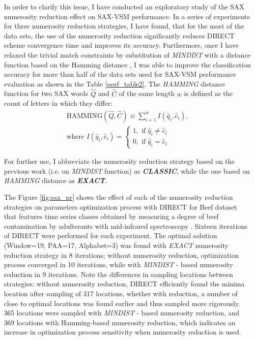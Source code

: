 In order to clarify this issue, I have conducted an exploratory study of the SAX numerosity reduction 
effect on SAX-VSM performance. In a series of experiments for three numerosity reduction strategies, I have found, 
that for the most of the data sets, the use of the numerosity reduction significantly reduces DIRECT scheme convergence 
time and improves its accuracy. 
Furthermore, once I have relaxed the trivial match constraints by substitution of \textit{MINDIST} 
with a distance function based on the Hamming distance \cite{hamming}, 
I was able to improve the classification accuracy for more than half of the data sets used for \mbox{SAX-VSM}
performance evaluation as shown in the Table \ref{perf_table2}. 
The \textit{HAMMING} distance function for two SAX words $\hat{Q}$ and $\hat{C}$ of the same length $w$ 
is defined as the count of letters in which they differ:
\begin{equation}
\label{eq:hamming}
\begin{split}
\text{HAMMING}(\widehat{Q},\widehat{C}) \equiv \sum_{i=1}^{w} I( \widehat{q}_{i}, \widehat{c}_{i} ), \\
\text{where } I( \widehat{q}_{i}, \widehat{c}_{i} ) = 
\begin{cases}
 1,\text{ if } \widehat{q}_{i} \neq \widehat{c}_{i} \\
 0,\text{ if } \widehat{q}_{i} = \widehat{c}_{i}
\end{cases}
\end{split}                                                      
\end{equation}

For further use, I abbreviate the numerosity reduction strategy based on the previous work (i.e. on \textit{MINDIST} 
function) as \textit{\textbf{CLASSIC}}, while the one based on \textit{HAMMING} distance as \textit{\textbf{EXACT}}.

The Figure \ref{fig:sax_nr} shows the effect of each of the numerosity reduction strategies on parameters optimization
process with DIRECT for Beef dataset that features time series classes obtained by measuring a degree of beef contamination 
by adulterants with mid-infrared spectroscopy \cite{citeulike:12859637}. 
Sixteen iterations of DIRECT were performed for each experiment. 
The optimal solution (Window=19, PAA=17, Alphabet=3) was found with \textit{EXACT} numerosity reduction strategy 
in 8 iterations; without numerosity reduction, optimization process converged in 10 iterations, while 
with \textit{MINDIST} - based numerosity reduction in 9 iterations. 
Note the differences in sampling locations between strategies: without numerosity reduction, DIRECT efficiently found 
the minima location after sampling of 317 locations, whether with reduction, a number of close to optimal locations was 
found earlier and thus sampled more rigorously. 
365 locations were sampled with \textit{MINDIST} - based numerosity reduction, and 369 locations with Hamming-based 
numerosity reduction, which indicates an increase in optimization process sensitivity when numerosity reduction is used.

